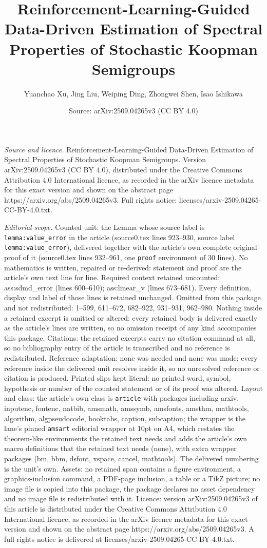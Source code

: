 \documentclass[10pt,a4paper]{amsart}
\title[Reinforcement-Learning-Guided Data-Driven Estimation of Spec]{Reinforcement-Learning-Guided Data-Driven Estimation of Spectral Properties of Stochastic Koopman Semigroups}
\author{Yuanchao Xu, Jing Liu, Weiping Ding, Zhongwei Shen, Isao Ishikawa}
\date{Source: arXiv:2509.04265v3 (CC BY 4.0)}
\begin{document}
\maketitle

\noindent\emph{Source and licence.} Reinforcement-Learning-Guided Data-Driven Estimation of Spectral Properties of Stochastic Koopman Semigroups. Version arXiv:2509.04265v3 (CC BY 4.0), distributed under the Creative Commons Attribution 4.0 International licence, as recorded in the arXiv licence metadata for this exact version and shown on the abstract page https://arxiv.org/abs/2509.04265v3. Full rights notice: licenses/arxiv-2509.04265-CC-BY-4.0.txt.\par\smallskip

\noindent\textit{Editorial scope.} Counted unit: the Lemma whose source label is \texttt{lemma:value\_error} in the article (source0.tex lines 923--930, source label \texttt{lemma:value\_error}), delivered together with the article's own complete original proof of it (source0.tex lines 932--961, one \texttt{proof} environment of 30 lines). No mathematics is written, repaired or re-derived: statement and proof are the article's own text line for line. Required context retained uncounted: ass:sdmd\_error (lines 600--610); ass:linear\_v (lines 673--681). Every definition, display and label of those lines is retained unchanged. Omitted from this package and not redistributed: 1--599, 611--672, 682--922, 931--931, 962--980. Nothing inside a retained excerpt is omitted or altered: every retained body is delivered exactly as the article's lines are written, so no omission receipt of any kind accompanies this package. Citations: the retained excerpts carry no citation command at all, so no bibliography entry of the article is transcribed and no reference is redistributed. Reference adaptation: none was needed and none was made; every reference inside the delivered unit resolves inside it, so no unresolved reference or citation is produced. Printed slips kept literal: no printed word, symbol, hypothesis or number of the counted statement or of its proof was altered. Layout and class: the article's own class is \texttt{article} with packages including arxiv, inputenc, fontenc, natbib, amsmath, amssymb, amsfonts, amsthm, mathtools, algorithm, algpseudocode, booktabs, caption, subcaption; the wrapper is the lane's pinned \texttt{amsart} editorial wrapper at 10pt on A4, which restates the theorem-like environments the retained text needs and adds the article's own macro definitions that the retained text needs (none), with extra wrapper packages (bm, bbm, dsfont, xspace, cancel, mathtools). The delivered numbering is the unit's own. Assets: no retained span contains a figure environment, a graphics-inclusion command, a PDF-page inclusion, a table or a TikZ picture; no image file is copied into this package, the package declares no asset dependency and no image file is redistributed with it. Licence: version arXiv:2509.04265v3 of this article is distributed under the Creative Commons Attribution 4.0 International licence, as recorded in the arXiv licence metadata for this exact version and shown on the abstract page https://arxiv.org/abs/2509.04265v3. A full rights notice is delivered at licenses/arxiv-2509.04265-CC-BY-4.0.txt. 
\end{document}
